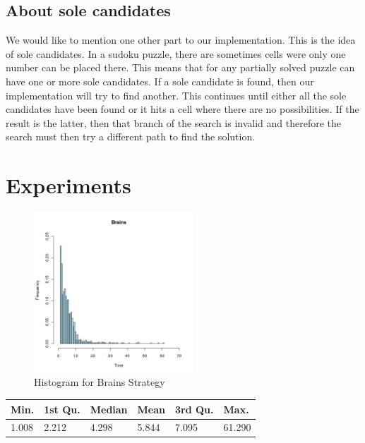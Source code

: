 \documentclass[letterpaper]{article}
\begin{document}
\subsection{About sole candidates}

We would like to mention one other part to our implementation. This is the idea of sole candidates. In a sudoku puzzle, there are sometimes cells were only one number can be placed there. This means that for any partially solved puzzle can have one or more sole candidates. If a sole candidate is found, then our implementation will try to find another. This continues until either all the sole candidates have been found or it hits a cell where there are no possibilities. If the result is the latter, then that branch of the search is invalid and therefore the search must then try a different path to find the solution.

\section{Experiments}
	\begin{figure}[h]
		\centering
		\includegraphics[width=60mm]{./brains_stats.jpg}
		\caption{Histogram for Brains Strategy}
	\label{fig:brains-strategy}
\end{figure}

\begin{tabular}{|l|l|l|l|l|l|}
\hline
Min. & 1st Qu.  & Median & Mean & 3rd Qu. & Max. \\
\hline
  1.008 & 2.212 & 4.298 & 5.844 & 7.095 & 61.290\\
\hline
\end{tabular}
\end{document}
